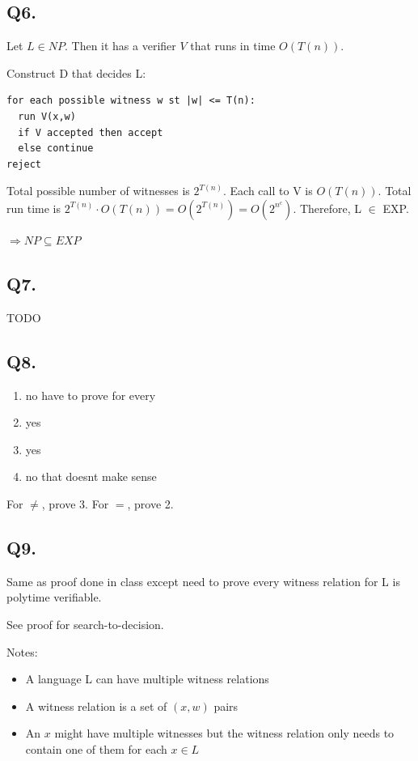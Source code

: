 \documentclass[letterpaper]{article}
\begin{document}
\subsection*{Q6.}

Let $L \in NP$. Then it has a verifier $V$ that runs in time $O(T(n))$.

Construct D that decides L:
\begin{verbatim}
for each possible witness w st |w| <= T(n):
  run V(x,w)
  if V accepted then accept
  else continue
reject
\end{verbatim}

Total possible number of witnesses is $2^{T(n)}$.
Each call to V is $O(T(n))$.
Total run time is $2^{T(n)} \cdot O(T(n)) = O(2^{T(n)}) = O(2^{n^c})$.
Therefore, L $\in$ EXP.

$\Rightarrow NP \subseteq EXP$

\subsection*{Q7.}
TODO

\subsection*{Q8.}

\begin{enumerate}
  \item no have to prove for every
  \item yes
  \item yes
  \item no that doesnt make sense
\end{enumerate}

For $\ne$, prove 3. For $=$, prove 2.

\subsection*{Q9.}

Same as proof done in class except need to prove every witness
relation for L is polytime verifiable.

See proof for search-to-decision.

Notes:
\begin{itemize}
  \item A language L can have multiple witness relations
  \item A witness relation is a set of $(x,w)$ pairs
  \item An $x$ might have multiple witnesses but the witness relation only needs to contain one of them for each $x \in L$
\end{itemize}
\end{document}
